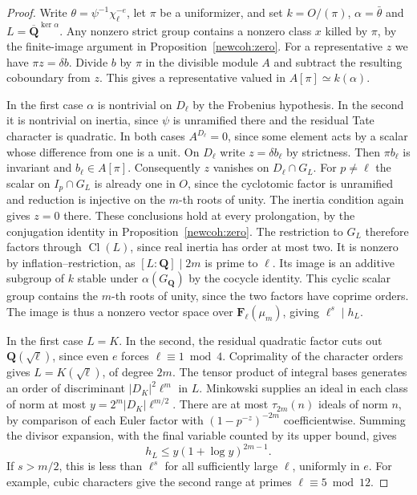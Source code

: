 \begin{proof}
Write \(\theta=\psi^{-1}\chi_\ell^{-e}\), let \(\pi\) be a uniformizer,
and set \(k=O/(\pi)\), \(\alpha=\bar\theta\) and
\(L=\overline{\mathbf Q}^{\ker\alpha}\).
Any nonzero strict group contains a nonzero class \(x\) killed by
\(\pi\), by the finite-image argument in Proposition~\ref{newcoh:zero}.
For a representative \(z\) we have \(\pi z=\delta b\). Divide \(b\)
by \(\pi\) in the divisible module \(A\) and subtract the resulting
coboundary from \(z\). This gives a representative valued in
\(A[\pi]\simeq k(\alpha)\).

In the first case \(\alpha\) is nontrivial on \(D_\ell\) by the
Frobenius hypothesis. In the second it is nontrivial on inertia,
since \(\psi\) is unramified there and the residual Tate character
is quadratic. In both cases \(A^{D_\ell}=0\), since some element
acts by a scalar whose difference from one is a unit. On \(D_\ell\)
write \(z=\delta b_\ell\) by strictness. Then \(\pi b_\ell\) is
invariant and \(b_\ell\in A[\pi]\). Consequently \(z\) vanishes on
\(D_\ell\cap G_L\). For \(p\ne\ell\) the scalar on
\(I_p\cap G_L\) is already one in \(O\), since the cyclotomic factor
is unramified and reduction is injective on the \(m\)-th roots of
unity. The inertia condition again gives \(z=0\) there. These
conclusions hold at every prolongation, by the conjugation identity
in Proposition~\ref{newcoh:zero}. The restriction to \(G_L\)
therefore factors through \(\operatorname{Cl}(L)\), since real
inertia has order at most two. It is nonzero by inflation--restriction,
as \([L:\mathbf Q]\mid2m\) is prime to \(\ell\). Its image is an
additive subgroup of \(k\) stable under \(\alpha(G_{\mathbf Q})\)
by the cocycle identity. This cyclic scalar group contains the
\(m\)-th roots of unity, since the two factors have coprime orders.
The image is thus a nonzero vector space over
\(\mathbf F_\ell(\mu_m)\), giving \(\ell^s\mid h_L\).

In the first case \(L=K\). In the second, the residual quadratic
factor cuts out \(\mathbf Q(\sqrt{\ell})\), since even \(e\) forces
\(\ell\equiv1\bmod4\). Coprimality of the character orders gives
\(L=K(\sqrt{\ell})\), of degree \(2m\). The tensor product of
integral bases generates an order of discriminant
\(|D_K|^2\ell^m\) in \(L\). Minkowski supplies an ideal in each
class of norm at most \(y=2^m|D_K|\ell^{m/2}\).
There are at most \(\tau_{2m}(n)\) ideals of norm \(n\), by comparison
of each Euler factor with \((1-p^{-z})^{-2m}\) coefficientwise.
Summing the divisor expansion, with the final variable counted by
its upper bound, gives
\[
 h_L\le y(1+\log y)^{2m-1}.
\]
If \(s>m/2\), this is less than \(\ell^s\) for all sufficiently
large \(\ell\), uniformly in \(e\). For example, cubic characters
give the second range at primes \(\ell\equiv5\bmod12\).
\end{proof}

